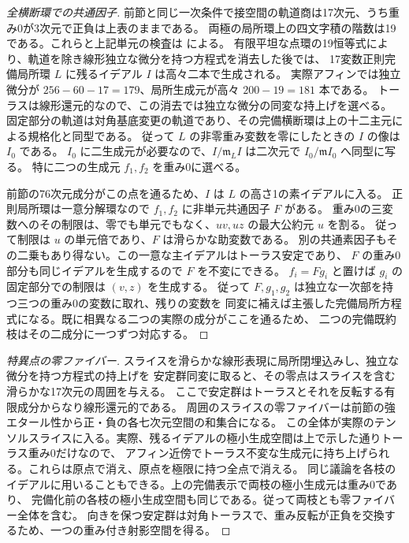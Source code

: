 \begin{proof}[全横断環での共通因子]
前節と同じ一次条件で接空間の軌道商は17次元、うち重み0が3次元で正負は上表のままである。
両極の局所環上の四文字積の階数は19である。これらと上記単元の検査は
 による。
有限平坦な点環の19恒等式により、軌道を除き線形独立な微分を持つ方程式を消去した後では、
17変数正則完備局所環 $L$ に残るイデアル $I$ は高々二本で生成される。
実際アフィンでは独立微分が $256-60-17=179$、局所生成元が高々 $200-19=181$ 本である。
トーラスは線形還元的なので、この消去では独立な微分の同変な持上げを選べる。
固定部分の軌道は対角基底変更の軌道であり、その完備横断環は上の十二主元による規格化と同型である。
従って $L$ の非零重み変数を零にしたときの $I$ の像は $I_0$ である。
$I_0$ に二生成元が必要なので、$I/\mathfrak m_L I$ は二次元で $I_0/\mathfrak m I_0$ へ同型に写る。
特に二つの生成元 $f_1,f_2$ を重み0に選べる。

前節の76次元成分がこの点を通るため、$I$ は $L$ の高さ1の素イデアルに入る。
正則局所環は一意分解環なので $f_1,f_2$ に非単元共通因子 $F$ がある。
重み0の三変数へのその制限は、零でも単元でもなく、$uv,uz$ の最大公約元 $u$ を割る。
従って制限は $u$ の単元倍であり、$F$ は滑らかな助変数である。
別の共通素因子もその二乗もあり得ない。この一意な主イデアルはトーラス安定であり、
$F$ の重み0部分も同じイデアルを生成するので $F$ を不変にできる。
$f_i=F g_i$ と置けば $g_i$ の固定部分での制限は $(v,z)$ を生成する。
従って $F,g_1,g_2$ は独立な一次部を持つ三つの重み0の変数に取れ、残りの変数を
同変に補えば主張した完備局所方程式になる。既に相異なる二つの実際の成分がここを通るため、
二つの完備既約枝はその二成分に一つずつ対応する。
\end{proof}

\begin{proof}[特異点の零ファイバー]
スライスを滑らかな線形表現に局所閉埋込みし、独立な微分を持つ方程式の持上げを
安定群同変に取ると、その零点はスライスを含む滑らかな17次元の周囲を与える。
ここで安定群はトーラスとそれを反転する有限成分からなり線形還元的である。
周囲のスライスの零ファイバーは前節の強エタール性から正・負の各七次元空間の和集合になる。
この全体が実際のテンソルスライスに入る。実際、残るイデアルの極小生成空間は上で示した通りトーラス重み0だけなので、
アフィン近傍でトーラス不変な生成元に持ち上げられる。これらは原点で消え、原点を極限に持つ全点で消える。
同じ議論を各枝のイデアルに用いることもできる。上の完備表示で両枝の極小生成元は重み0であり、
完備化前の各枝の極小生成空間も同じである。従って両枝とも零ファイバー全体を含む。
向きを保つ安定群は対角トーラスで、重み反転が正負を交換するため、一つの重み付き射影空間を得る。
\end{proof}
